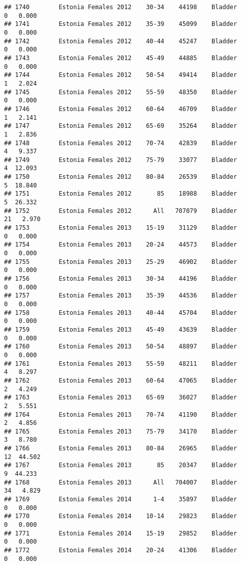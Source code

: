 \documentclass[
]{article}
\begin{document}
\begin{verbatim}
## 1740        Estonia Females 2012    30-34    44198    Bladder      0   0.000
## 1741        Estonia Females 2012    35-39    45099    Bladder      0   0.000
## 1742        Estonia Females 2012    40-44    45247    Bladder      0   0.000
## 1743        Estonia Females 2012    45-49    44885    Bladder      0   0.000
## 1744        Estonia Females 2012    50-54    49414    Bladder      1   2.024
## 1745        Estonia Females 2012    55-59    48350    Bladder      0   0.000
## 1746        Estonia Females 2012    60-64    46709    Bladder      1   2.141
## 1747        Estonia Females 2012    65-69    35264    Bladder      1   2.836
## 1748        Estonia Females 2012    70-74    42839    Bladder      4   9.337
## 1749        Estonia Females 2012    75-79    33077    Bladder      4  12.093
## 1750        Estonia Females 2012    80-84    26539    Bladder      5  18.840
## 1751        Estonia Females 2012       85    18988    Bladder      5  26.332
## 1752        Estonia Females 2012      All   707079    Bladder     21   2.970
## 1753        Estonia Females 2013    15-19    31129    Bladder      0   0.000
## 1754        Estonia Females 2013    20-24    44573    Bladder      0   0.000
## 1755        Estonia Females 2013    25-29    46902    Bladder      0   0.000
## 1756        Estonia Females 2013    30-34    44196    Bladder      0   0.000
## 1757        Estonia Females 2013    35-39    44536    Bladder      0   0.000
## 1758        Estonia Females 2013    40-44    45704    Bladder      0   0.000
## 1759        Estonia Females 2013    45-49    43639    Bladder      0   0.000
## 1760        Estonia Females 2013    50-54    48897    Bladder      0   0.000
## 1761        Estonia Females 2013    55-59    48211    Bladder      4   8.297
## 1762        Estonia Females 2013    60-64    47065    Bladder      2   4.249
## 1763        Estonia Females 2013    65-69    36027    Bladder      2   5.551
## 1764        Estonia Females 2013    70-74    41190    Bladder      2   4.856
## 1765        Estonia Females 2013    75-79    34170    Bladder      3   8.780
## 1766        Estonia Females 2013    80-84    26965    Bladder     12  44.502
## 1767        Estonia Females 2013       85    20347    Bladder      9  44.233
## 1768        Estonia Females 2013      All   704007    Bladder     34   4.829
## 1769        Estonia Females 2014      1-4    35897    Bladder      0   0.000
## 1770        Estonia Females 2014    10-14    29823    Bladder      0   0.000
## 1771        Estonia Females 2014    15-19    29852    Bladder      0   0.000
## 1772        Estonia Females 2014    20-24    41306    Bladder      0   0.000

\end{verbatim}
\end{document}
